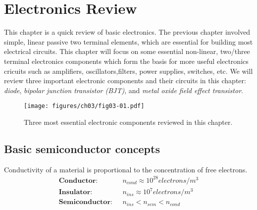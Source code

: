 \chapter{Electronics Review}\label{chp:electronics}

This chapter is a quick review of basic electronics. The previous chapter involved simple, linear passive two terminal elements, which are essential for building most electrical circuits. This chapter will focus on some essential non-linear, two/three terminal electronics components which form the basis for more useful electronics cricuits such as amplifiers, oscillators,filters, power supplies, switches, etc. We will review three important electronic components and their circuits in this chapter: \textit{diode}, \textit{bipolar junction transistor (BJT)}, and \textit{metal oxide field effect transistor}.

\begin{figure}[b]
    \centering
    \texttt{[image: figures/ch03/fig03-01.pdf]}
    \caption{Three most essential electronic components reviewed in this chapter.}
    \label{fig:03-01}
\end{figure}

\section{Basic semiconductor concepts}
Conductivity of a material is proportional to the concentration of free electrons.
\begin{equation}
    \begin{split}
    \textbf{Conductor: }\,\, & n_{cond} \approx 10^{28} electrons/m^3 \\
    \textbf{Insulator: }\,\, & n_{ins} \approx 10^{7} electrons/m^3 \\
    \textbf{Semiconductor: }\,\, & n_{ins} < n_{sem} < n_{cond}
    \end{split}
    \label{eq:ch03-elec-conc}
\end{equation}

